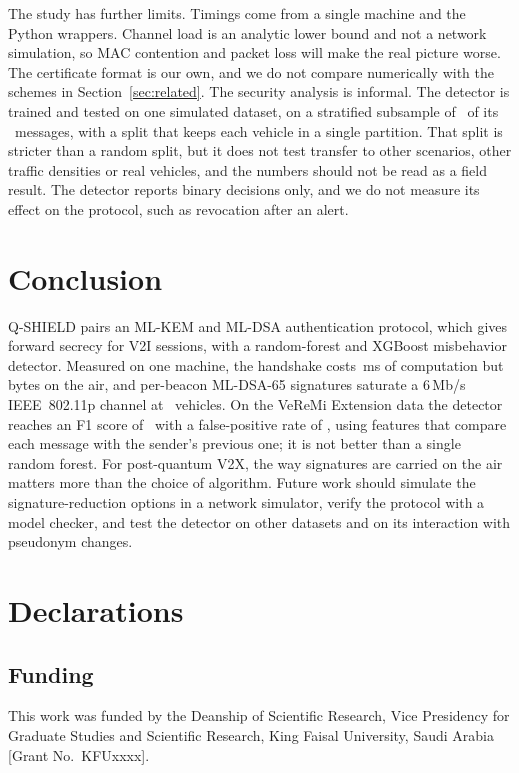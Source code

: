\documentclass[journal,twoside]{IEEEtran}
\begin{document}
The study has further limits. Timings come from a single machine and the Python wrappers. Channel load is an analytic lower bound and not a network simulation, so MAC contention and packet loss will make the real picture worse. The certificate format is our own, and we do not compare numerically with the schemes in Section~\ref{sec:related}. The security analysis is informal. The detector is trained and tested on one simulated dataset, on a stratified subsample of \idsRows\ of its \idsRowsTotal\ messages, with a split that keeps each vehicle in a single partition. That split is stricter than a random split, but it does not test transfer to other scenarios, other traffic densities or real vehicles, and the numbers should not be read as a field result. The detector reports binary decisions only, and we do not measure its effect on the protocol, such as revocation after an alert.

\section{Conclusion}
\label{sec:conclusion}

Q-SHIELD pairs an ML-KEM and ML-DSA authentication protocol, which gives forward secrecy for V2I sessions, with a random-forest and XGBoost misbehavior detector. Measured on one machine, the handshake costs \hsQMs\,ms of computation but \hsQBytes\,bytes on the air, and per-beacon ML-DSA-65 signatures saturate a 6\,Mb/s IEEE~802.11p channel at \ovQCap\ vehicles. On the VeReMi Extension data the detector reaches an F1 score of \idsEnsF\ with a false-positive rate of \idsEnsFPR, using features that compare each message with the sender's previous one; it is not better than a single random forest. For post-quantum V2X, the way signatures are carried on the air matters more than the choice of algorithm. Future work should simulate the signature-reduction options in a network simulator, verify the protocol with a model checker, and test the detector on other datasets and on its interaction with pseudonym changes.

\section*{Declarations}

\subsection*{Funding}
This work was funded by the Deanship of Scientific Research, Vice Presidency for Graduate Studies and Scientific Research, King Faisal University, Saudi Arabia [Grant No.~KFUxxxx].
\end{document}
